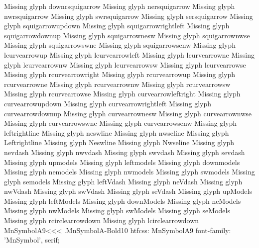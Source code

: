 Missing glyph	downrsquigarrow
Missing glyph	nersquigarrow
Missing glyph	nwrsquigarrow
Missing glyph	swrsquigarrow
Missing glyph	sersquigarrow
Missing glyph	squigarrowupdown
Missing glyph	squigarrowrightleft
Missing glyph	squigarrowdownup
Missing glyph	squigarrownesw
Missing glyph	squigarrownwse
Missing glyph	squigarrowswne
Missing glyph	squigarrowsenw
Missing glyph	lcurvearrowup
Missing glyph	lcurvearrowleft
Missing glyph	lcurvearrowne
Missing glyph	lcurvearrownw
Missing glyph	lcurvearrowsw
Missing glyph	lcurvearrowse
Missing glyph	rcurvearrowright
Missing glyph	rcurvearrowup
Missing glyph	rcurvearrowne
Missing glyph	rcurvearrownw
Missing glyph	rcurvearrowsw
Missing glyph	rcurvearrowse
Missing glyph	curvearrowleftright
Missing glyph	curvearrowupdown
Missing glyph	curvearrowrightleft
Missing glyph	curvearrowdownup
Missing glyph	curvearrownesw
Missing glyph	curvearrownwse
Missing glyph	curvearrowswne
Missing glyph	curvearrowsenw
Missing glyph	leftrightline
Missing glyph	neswline
Missing glyph	nwseline
Missing glyph	Leftrightline
Missing glyph	Neswline
Missing glyph	Nwseline
Missing glyph	nevdash
Missing glyph	nwvdash
Missing glyph	swvdash
Missing glyph	sevdash
Missing glyph	upmodels
Missing glyph	leftmodels
Missing glyph	downmodels
Missing glyph	nemodels
Missing glyph	nwmodels
Missing glyph	swmodels
Missing glyph	semodels
Missing glyph	leftVdash
Missing glyph	neVdash
Missing glyph	nwVdash
Missing glyph	swVdash
Missing glyph	seVdash
Missing glyph	upModels
Missing glyph	leftModels
Missing glyph	downModels
Missing glyph	neModels
Missing glyph	nwModels
Missing glyph	swModels
Missing glyph	seModels
Missing glyph	rcirclearrowdown
Missing glyph	lcirclearrowdown
\<MnSymbolA9\><<<
.MnSymbolA-Bold10
htfcss:  MnSymbolA9  font-family: 'MnSymbol', serif;

